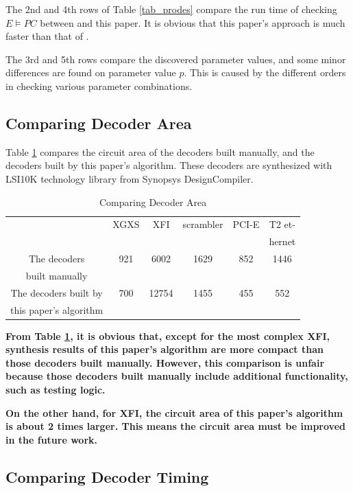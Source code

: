 \documentclass[journal]{IEEEtran}
\begin{document}
The 2nd and 4th rows of Table \ref{tab_prodes} compare the run time of checking $E\vDash PC$ between \cite{ShengYuShen:fmcad10} and this paper.
It is obvious that this paper's approach is much faster than that of \cite{ShengYuShen:fmcad10}.

The 3rd and 5th rows compare the discovered parameter values,
and some minor differences are found on parameter value $p$.
This is caused by the different orders in checking various parameter combinations.

\subsection{Comparing Decoder Area}\label{subsec_area}

Table \ref{tab_cmparea} compares the circuit area of the decoders built manually,
and the decoders built by this paper's algorithm.
These decoders are synthesized with LSI10K technology library from Synopsys DesignCompiler.

\begin{table}[t]
\centering
\caption{Comparing Decoder Area}
\begin{tabular}{|c|c|c|c|c|c|}
\hline
                   &XGXS      &XFI       &scrambler    &PCI-E  &T2 et-\\
&&&&&hernet\\ \hline
The decoders       &921       &6002      &1629         &852   &1446          \\
built manually           &&&&&\\ \hline
The decoders built by      &700       &12754     &1455         &455   &552          \\
this paper's algorithm   &&&&&\\ \hline
\end{tabular}\label{tab_cmparea}
\end{table}

\textbf{From Table \ref{tab_cmparea},
it is obvious that,
except for the most complex XFI, synthesis results of this paper's algorithm
are more compact than those decoders built manually. However,
this comparison is unfair because those decoders built manually
include additional functionality, 
such as testing logic.}

\textbf{On the other hand,
for XFI,
the circuit area of this paper's algorithm is about 2 times larger.
This means the circuit area must be improved in the future work.}


\subsection{Comparing Decoder Timing}\label{subsec_timing}
\end{document}
